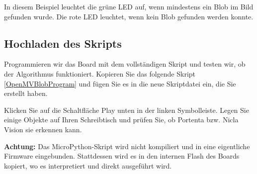 In diesem Beispiel leuchtet die grüne LED auf, wenn mindestens ein Blob im Bild gefunden wurde. Die rote LED leuchtet, wenn kein Blob gefunden werden konnte.

\subsection{Hochladen des Skripts}


Programmieren wir das Board mit dem vollständigen Skript und testen wir, ob der Algorithmus funktioniert. Kopieren Sie das folgende Skript \ref{OpenMVBlobProgram} und fügen Sie es in die neue Skriptdatei ein, die Sie erstellt haben.

\begin{code}
	
	
	
	
	\caption{Initialisierung der LEDs}\label{OpenMVBlobProgram}
\end{code}

Klicken Sie auf die Schaltfläche \glqq Play\grqq{} unten in der linken Symbolleiste. Legen Sie einige Objekte auf Ihren Schreibtisch und prüfen Sie, ob Portenta bzw. Nicla Vision sie erkennen kann.

\bigskip


\textbf{Achtung:} Das MicroPython-Skript wird nicht kompiliert und in eine eigentliche Firmware eingebunden. Stattdessen wird es in den internen Flash des Boards kopiert, wo es interpretiert und direkt ausgeführt wird.

